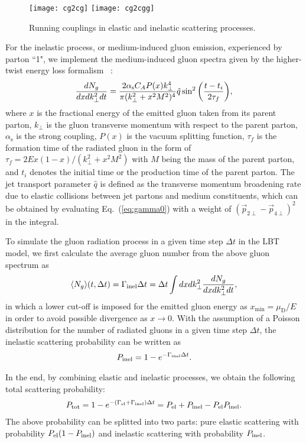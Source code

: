 \documentclass[aps,superscriptaddress,prc,twocolumn,nofootinbib]{revtex4}
\begin{document}
\begin{figure*}[htb]
\texttt{[image: cg2cg]}
\texttt{[image: cg2cgg]}
\caption{Running couplings in elastic and inelastic scattering processes.}
\label{cg_el_inel}
\end{figure*}


For the inelastic process, or medium-induced gluon emission, experienced by parton ``1", we implement the medium-induced gluon spectra given by the higher-twist energy loss formalism ~\cite{Wang:2001ifa, Zhang:2003wk}:
\begin{align}
\frac{dN_g}{dx dk_\perp^2 dt}=\frac{2 \alpha_{\rm s} C_A P(x)k_\perp^4}{\pi (k_\perp^2+x^2M^2)^4} \hat{q} \sin^2 \bigg(\frac{t-t_i}{2\tau_f} \bigg),
\end{align}
where $x$ is the fractional energy of the emitted gluon taken from its parent parton, $k_\perp$ is the gluon transverse momentum with respect to the parent parton, $\alpha_\mathrm{s}$ is the strong coupling, $P(x)$ is the vacuum splitting function, $\tau_f$ is the formation time of the radiated gluon in the form of $\tau_f=2Ex (1-x)/(k_\perp^2+x^2 M^2)$ with $M$ being the mass of the parent parton, and $t_i$ denotes the initial time or the production time of the parent parton. {\color{red} The jet transport parameter $\hat{q}$ is defined as the transverse momentum broadening rate due to elastic collisions between jet partons and medium constituents, which can be obtained by evaluating Eq.~(\ref{eq:gamma0}) with a weight of $(\vec{p}_{2\perp}-\vec{p}_{4\perp})^2$ in the integral.}

To simulate the gluon radiation process in a given time step $\Delta t$ in the LBT model, we first calculate the average gluon number from the above gluon spectrum as
\begin{align}
	\langle N_g \rangle(t, \Delta t) = \Gamma_{\rm inel} \Delta t = \Delta t \int dx dk_\perp^2 \frac{dN_g}{dx dk_\perp^2 dt},
\end{align}
in which a lower cut-off is imposed for the emitted gluon energy as $x_\mathrm{min}=\mu_\mathrm{D}/E$ in order to avoid possible divergence as $x\rightarrow 0$.
With the assumption of a Poisson distribution for the number of radiated gluons in a given time step $\Delta t$, the inelastic scattering probability can be written as
\begin{align}
P_\mathrm{inel}=1-e^{-\Gamma_{\rm inel}\Delta t}.
\end{align}

In the end, by combining elastic and inelastic processes, we obtain the following total scattering probability:
\begin{align}
	P_{\rm tot} = 1-e^{-(\Gamma_{\rm el}+\Gamma_{\rm inel})\Delta t} = P_{\rm el} + P_{\rm inel} - P_{\rm el} P_{\rm inel}.
\end{align}
The above probability can be splitted into two parts: pure elastic scattering with probability  $P_{\rm el} (1 - P_{\rm inel})$ and inelastic scattering with probability $P_{\rm inel}$.
\end{document}
